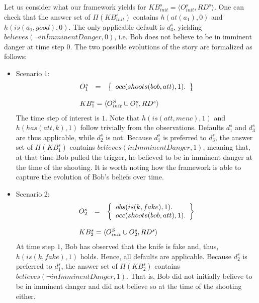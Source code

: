 \documentclass{article}
\begin{document}
Let us consider what our framework yields for $KB^s_{init}=\langle O^s_{init},RD^s \rangle$. One can check that the answer set of $\Pi(KB^s_{init})$ contains $h(at(a_1),0)$ and $h(is(a_1,good),0)$. The only applicable default is $d^s_3$, yielding $believes(\neg inImminentDanger,0)$, i.e. Bob does not believe to be in imminent danger at time step $0$. The two possible evolutions of the story are formalized as follows:
\begin{itemize}
\item Scenario 1: \[
\begin{array}{lll}
O^s_{1} & = & \left\{
\begin{array}{l} 
occ(shoots(bob,att),1). 
\end{array}
\right\}\\
\ \\
\multicolumn{3}{l}{KB^s_1=\langle O^S_{init} \cup O^s_1,RD^s \rangle}
\end{array}
\]
The time step of interest is $1$. Note that $h(is(att,menc),1)$ and $h(has(att,k),1)$ follow trivially from the observations. Defaults $d^s_1$ and $d^s_3$ are thus applicable, while $d^{s}_2$ is not.  Because $d^s_1$ is preferred to $d^s_3$, the answer set of $\Pi(KB^s_1)$ contains $believes(inImminentDanger, 1)$, meaning that, at that time Bob pulled the trigger, he believed to be in imminent danger at the time of the shooting. It is worth noting how the framework is able to capture the evolution of Bob's beliefs over time.  
\item Scenario 2: \[
\begin{array}{lll}
O^s_{2} & = & \left\{
\begin{array}{l} 
obs(is(k,fake),1). \\   %
occ(shoots(bob,att),1).
\end{array}
\right\} \\
\ \\
\multicolumn{3}{l}{KB^s_2=\langle O^S_{init} \cup O^s_2,RD^s \rangle}
\end{array}
\]
At time step $1$, Bob has observed that the knife is fake and, thus, $h(is(k,fake),1)$ holds. Hence, all defaults are applicable.  Because $d^s_2$ is preferred to $d^s_1$, the answer set of $\Pi(KB^s_2)$ contains $believes(\neg inImminentDanger, 1)$. That is, Bob did not initially believe to be in imminent danger and did not believe so at the time of the shooting either. 
\end{itemize}

\end{document}

